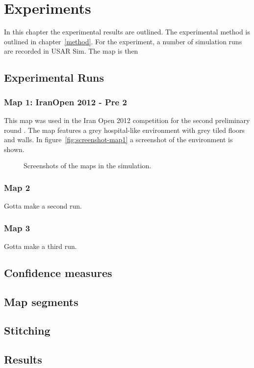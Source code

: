 \chapter{Experiments}
\label{experiments}
In this chapter the experimental results are outlined. The experimental method is outlined in chapter~\ref{method}. For the experiment, a number of simulation runs are recorded in USAR Sim. The map is then 

\section{Experimental Runs}
\subsection{Map 1: IranOpen 2012 - Pre 2}
This map was used in the Iran Open 2012 competition for the second preliminary round \cite{iran2012}. The map features a grey hospital-like environment with grey tiled floors and walls. In figure~\ref{fig:screenshot-map1} a screenshot of the environment is shown.

\begin{figure}[ht]
\centering
{}
\caption{Screenshots of the maps in the simulation.}
\label{fig:screenshots}
\end{figure}

\subsection{Map 2}
Gotta make a second run.

\subsection{Map 3}
Gotta make a third run.

\section{Confidence measures}


\section{Map segments}

\section{Stitching}

\section{Results}